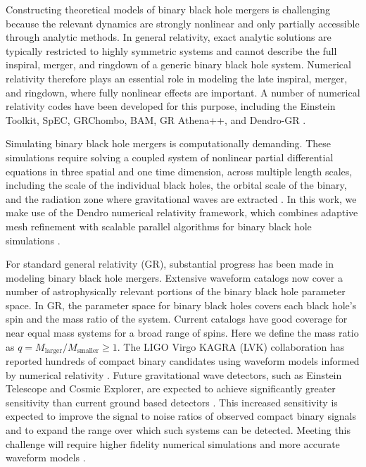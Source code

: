 Constructing theoretical models of binary black hole mergers is challenging because the relevant dynamics are strongly nonlinear and only partially accessible through analytic methods. In general relativity, exact analytic solutions are typically restricted to highly symmetric systems and cannot describe the full inspiral, merger, and ringdown of a generic binary black hole system. Numerical relativity therefore plays an essential role in modeling the late inspiral, merger, and ringdown, where fully nonlinear effects are important. A number of numerical relativity codes have been developed for this purpose, including the Einstein Toolkit, SpEC, GRChombo, BAM, GR Athena++, and Dendro-GR \cite{Loffler2012,Boyle2019,Brugmann2008,Clough2015,Daszuta2021_GRAthena,Fernando2023}.

Simulating binary black hole mergers is computationally demanding. These simulations require solving a coupled system of nonlinear partial differential equations in three spatial and one time dimension, across multiple length scales, including the scale of the individual black holes, the orbital scale of the binary, and the radiation zone where gravitational waves are extracted \cite{Baumgarte2010,BaumgarteShapiro2021}. In this work, we make use of the Dendro numerical relativity framework, which combines adaptive mesh refinement with scalable parallel algorithms for binary black hole simulations \cite{Fernando2019,Fernando2019b,Fernando2023}.

For standard general relativity (GR), substantial progress has been made in modeling binary black hole mergers. Extensive
waveform catalogs now cover a number of astrophysically relevant portions of the binary black hole parameter space. In GR, the parameter space for binary black holes covers each black hole's spin and the mass ratio of the system. Current catalogs have
good coverage for near equal mass systems for a broad range of spins. Here we define the mass ratio as
$q=M_{\mathrm{larger}}/M_{\mathrm{smaller}}\ge 1$. The LIGO  Virgo  KAGRA
(LVK) collaboration has reported hundreds of compact binary candidates using waveform
models informed by numerical relativity
\cite{GWTC3,GWTC4,Boyle2019}.  Future gravitational wave detectors, such as Einstein Telescope and Cosmic Explorer, are expected to achieve significantly greater sensitivity than current ground based detectors \cite{Maggiore2020_ET,Reitze2019_CosmicExplorer,Evans2021_CEHorizon}. This increased sensitivity is expected to improve the signal to noise ratios of observed compact binary signals and to expand the range over which such systems can be detected. Meeting this challenge will require higher fidelity numerical simulations and more accurate waveform models \cite{Purrer2020_AccuracyRequirements,Black2025_ORBIT}.


